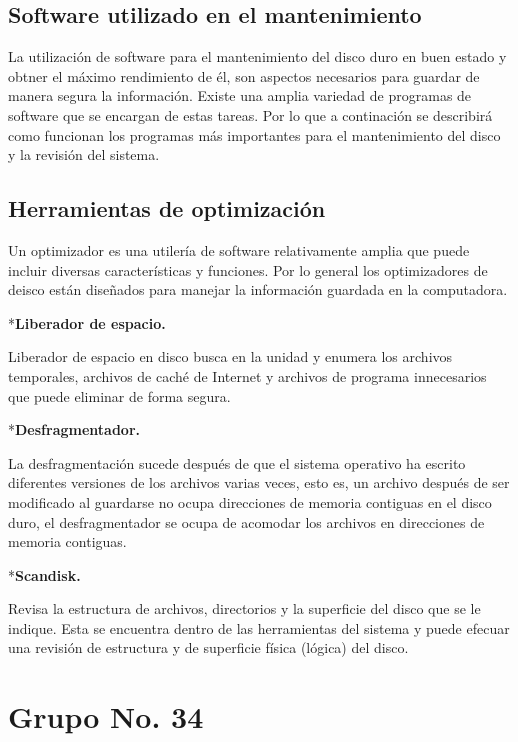 \documentclass[landscape]{article}
\begin{document}
\begin{multicols}{3}

\subsection*{Software utilizado en el mantenimiento}

La utilizaci\'on de software para el mantenimiento del disco duro en buen estado y obtner el m\'aximo rendimiento de \'el, son aspectos necesarios para guardar de manera segura la informaci\'on. Existe una amplia variedad de programas de software que se encargan de estas tareas.  Por lo que a continaci\'on se describir\'a como funcionan los programas m\'as importantes para el mantenimiento del disco y la revisi\'on del sistema.

\subsection*{Herramientas de optimizaci\'on}

Un optimizador es una utiler\'ia de software relativamente amplia que puede incluir diversas caracter\'isticas y funciones. Por lo general los optimizadores de deisco est\'an dise\~nados para manejar la informaci\'on guardada en la computadora.

*{\bf Liberador de espacio.}

Liberador de espacio en disco busca en la unidad y enumera los archivos temporales, archivos de cach\'e de Internet y archivos de programa innecesarios que puede eliminar de forma segura.

*{\bf Desfragmentador.}

La desfragmentaci\'on sucede despu\'es de que el sistema operativo ha escrito diferentes versiones de los archivos varias veces, esto es, un archivo despu\'es de ser modificado al guardarse no ocupa direcciones de memoria contiguas en el disco duro, el desfragmentador se ocupa de acomodar los archivos en direcciones de memoria contiguas.

*{\bf Scandisk.}

Revisa la estructura de archivos, directorios y la superficie del disco que se le indique. Esta se encuentra dentro de las herramientas del sistema y puede efecuar una revisi\'on de estructura y de superficie f\'isica (l\'ogica) del disco.


\columnbreak

\vspace*{10cm}
\section*{Grupo No. 34}
\vspace*{1cm}

\end{multicols}
\end{document}
